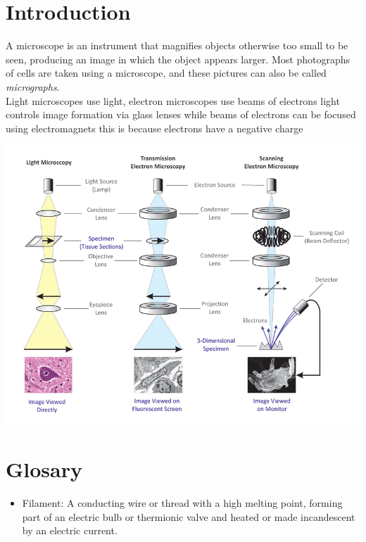\documentclass[a0paper,fleqn]{betterposter}
\begin{document}
{\section{Introduction}
A microscope is an instrument that magnifies objects otherwise too small to be seen, producing an image in which the object appears larger. Most photographs of cells are taken using a microscope, and these pictures can also be called \emph{micrographs}.
\\

Light microscopes use light, electron microscopes use beams of electrons light controls image formation via glass lenses while beams of electrons can be focused using electromagnets this is because electrons have a negative charge

\bigskip
\bigskip
\bigskip
\bigskip
\bigskip
\bigskip

\includegraphics[width=8in]{Light-Microscope-and-Electron-Microscope}


\vfill

}{

\section{Glosary}
\begin{itemize}

\item Filament: A conducting wire or thread with a high melting point, forming part of an electric bulb or thermionic valve and heated or made incandescent by an electric current.    


\end{itemize}}
\end{document}
